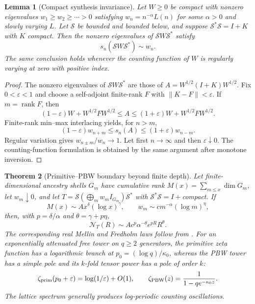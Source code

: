 \documentclass[10pt,reqno]{amsart}
\theoremstyle{plain}
\newtheorem{theorem}{Theorem}[section]
\newtheorem{lemma}[theorem]{Lemma}
\theoremstyle{definition}
\theoremstyle{remark}
\begin{document}
\begin{lemma}[Compact synthesis invariance]
\label{lem:compact-synthesis-invariance}
Let $W\ge0$ be compact with nonzero eigenvalues
$w_1\ge w_2\ge\cdots>0$ satisfying
$w_n=n^{-\alpha}L(n)$ for some $\alpha>0$ and slowly varying $L$.
Let $\mathscr S$ be bounded and bounded below, and suppose
$\mathscr S^*\mathscr S=I+K$ with $K$ compact.  Then the nonzero eigenvalues
of $\mathscr S W\mathscr S^*$ satisfy
\begin{equation}
 s_n(\mathscr S W\mathscr S^*)\sim w_n.
 \label{eq:compact-synthesis-invariance}
\end{equation}
The same conclusion holds whenever the counting function of $W$ is regularly
varying at zero with positive index.
\end{lemma}

\begin{proof}
The nonzero eigenvalues of $\mathscr S W\mathscr S^*$ are those of
$A=W^{1/2}(I+K)W^{1/2}$.  Fix $0<\varepsilon<1$ and choose a self-adjoint
finite-rank $F$ with $\|K-F\|<\varepsilon$.  If $m=\operatorname{rank}F$,
then
\[
 (1-\varepsilon)W+W^{1/2}FW^{1/2}
 \le A\le
 (1+\varepsilon)W+W^{1/2}FW^{1/2}.
\]
Finite-rank min--max interlacing yields, for $n>m$,
\[
 (1-\varepsilon)w_{n+m}
 \le s_n(A)\le
 (1+\varepsilon)w_{n-m}.
\]
Regular variation gives $w_{n\pm m}/w_n\to1$.  Let first $n\to\infty$ and
then $\varepsilon\downarrow0$.  The counting-function formulation is
obtained by the same argument after monotone inversion.
\end{proof}

\begin{theorem}[Primitive--PBW boundary beyond finite depth]
\label{thm:compact-infinite-tower}
Let finite-dimensional ancestry shells $G_m$ have cumulative rank
$M(x)=\sum_{m\le x}\dim G_m$, let $w_m\downarrow0$, and let
$T=\mathscr S(\bigoplus_m w_mI_{G_m})\mathscr S^*$ with
$\mathscr S^*\mathscr S=I+$compact.  If
\[
 M(x)\sim Ax^\delta(\log x)^\gamma,
 \qquad
 w_m\sim cm^{-\alpha}(\log m)^\eta,
\]
then, with $p=\delta/\alpha$ and $\theta=\gamma+p\eta$,
\[
 \mathcal N_T(R)
 \sim Ac^p\alpha^{-\theta}e^{pR}R^\theta.
\]
The corresponding real Mellin and Fredholm laws follow from
.  For an exponentially attenuated free tower
on $q\ge2$ generators, the primitive zeta function has a logarithmic branch at
$p_0=(\log q)/\kappa_0$, whereas the PBW tower has a simple pole and its
$k$-fold tensor power has a pole of order $k$:
\[
 \zeta_{\rm prim}(p_0+\varepsilon)=\log(1/\varepsilon)+O(1),
 \qquad
 \zeta_{\rm PBW}(z)=\frac1{1-qe^{-\kappa_0z}}.
\]
The lattice spectrum generally produces log-periodic counting oscillations.
\end{theorem}
\end{document}
